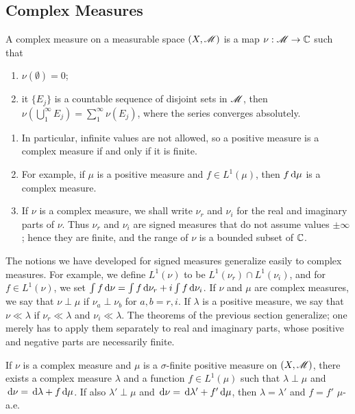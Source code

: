 \documentclass[12pt]{article} %
\begin{document}
\subsection{Complex Measures}

\begin{definition}
    A complex measure on a measurable space $(X, \mathscr{M})$ is a map $\nu : \mathscr{M} \to \mathbb{C}$ such that \begin{enumerate}
        \item $\nu(\emptyset) = 0$;
        \item it $\{E_j\}$ is a countable sequence of disjoint sets in $\mathscr{M}$, then $\nu(\bigcup_1^\infty E_j) = \sum_1^\infty \nu(E_j)$, where the series converges absolutely.
    \end{enumerate}
\end{definition}

\begin{remark}
    \begin{enumerate}
        \item In particular, infinite values are not allowed, so a positive measure is a complex measure if and only if it is finite. 
        \item For example, if $\mu$ is a positive measure and $f \in L^1(\mu)$, then $f \, \mathrm{d} \mu$ is a complex measure.
        \item If $\nu$ is a complex measure, we shall write $\nu_r$ and $\nu_i$ for the real and imaginary parts of $\nu$. Thus $\nu_r$ and $\nu_i$ are signed measures that do not assume values $\pm \infty$; hence they are finite, and the range of $\nu$ is a bounded subset of $\mathbb{C}$.
    \end{enumerate}
\end{remark}

The notions we have developed for signed measures generalize easily to complex measures. For example, we define $L^1(\nu)$ to be $L^1(\nu_r) \cap L^1(\nu_i)$, and for $f \in L^1(\nu)$, we set $\int f \, \mathrm{d} \nu = \int f \, \mathrm{d}\nu_r + i \int f \, \mathrm{d}\nu_i$. If $\nu$ and $\mu$ are complex measures, we say that $\nu \perp \mu$ if $\nu_a \perp \nu_b$ for $a, b = r, i$. If $\lambda$ is a positive measure, we say that $\nu \ll \lambda$ if $\nu_r \ll \lambda$ and $\nu_i \ll \lambda$. The theorems of the previous section generalize; one merely has to apply them separately to real and imaginary parts, whose positive and negative parts are necessarily finite.

\begin{theorem}\label{thm:complex-radon-nikodym}
    If $\nu$ is a complex measure and $\mu$ is a $\sigma$-finite positive measure on $(X, \mathscr{M})$, there exists a complex measure $\lambda$ and a function $f \in L^1(\mu)$ such that $\lambda \perp \mu$ and $\, \mathrm{d}\nu = \, \mathrm{d}\lambda + f \, \mathrm{d}\mu$. If also $\lambda' \perp \mu$ and $\, \mathrm{d}\nu = \, \mathrm{d}\lambda' + f'\, \mathrm{d}\mu$, then $\lambda = \lambda'$ and $f = f'$ $\mu$-a.e.
\end{theorem}
\end{document}

